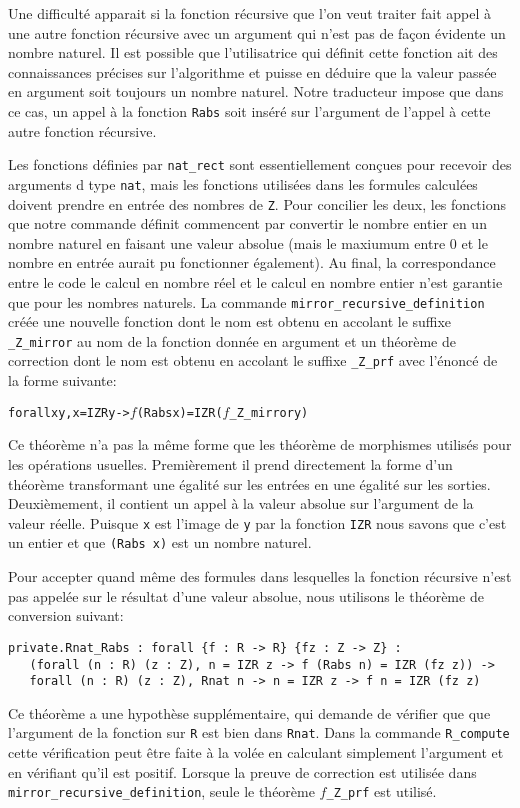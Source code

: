 \documentclass[draft]{jflart}
\begin{document}
Une difficulté apparait si la fonction récursive que l'on veut traiter
fait appel à une autre fonction récursive avec un argument qui n'est
pas de façon évidente un nombre naturel.  Il est possible que
l'utilisatrice qui définit cette fonction ait des connaissances
précises sur l'algorithme et puisse en déduire que la valeur passée
en argument soit toujours un nombre naturel.  Notre traducteur impose
que dans ce cas, un appel à la fonction \texttt{Rabs} soit inséré sur
l'argument de l'appel à cette autre fonction récursive.

Les fonctions définies par \texttt{nat\_rect} sont essentiellement
conçues pour recevoir des arguments d type \texttt{nat}, mais les
fonctions utilisées dans les formules calculées doivent prendre en
entrée des nombres de \texttt{Z}.  Pour concilier les deux, les fonctions
que notre commande définit commencent par convertir le nombre entier en
un nombre naturel en faisant une valeur absolue (mais le maxiumum
entre 0 et le nombre en entrée aurait pu fonctionner également).  Au
final, la correspondance entre le code le calcul en nombre réel et le
calcul en nombre entier n'est garantie que pour les nombres naturels.
La commande \texttt{mirror\_recursive\_definition} créée une nouvelle
fonction dont le nom est obtenu en accolant le suffixe
\texttt{\_Z\_mirror} au nom de la fonction donnée en argument et un théorème
de correction dont le nom est obtenu en accolant le suffixe
\texttt{\_Z\_prf} avec l'énoncé de la forme suivante:
\begin{alltt}
forall x y, x = IZR y -> \(f\) (Rabs x) = IZR (\(f\)_Z_mirror y)
\end{alltt}

Ce théorème n'a pas la même forme que les théorème de morphismes
utilisés pour les opérations usuelles.  Premièrement il prend
directement la forme d'un théorème transformant une égalité sur les
entrées en une égalité sur les sorties.  Deuxièmement, il contient
un appel à la valeur absolue sur l'argument de la valeur réelle.
Puisque \texttt{x} est l'image de \texttt{y} par la fonction \texttt{IZR} nous
savons que c'est un entier et que \texttt{(Rabs x)} est un nombre
naturel.

Pour accepter quand même des formules dans lesquelles la fonction
récursive n'est pas appelée sur le résultat d'une valeur absolue, nous
utilisons le théorème de conversion suivant:
\begin{verbatim}
private.Rnat_Rabs : forall {f : R -> R} {fz : Z -> Z} :
   (forall (n : R) (z : Z), n = IZR z -> f (Rabs n) = IZR (fz z)) ->
   forall (n : R) (z : Z), Rnat n -> n = IZR z -> f n = IZR (fz z)
\end{verbatim}
Ce théorème a une hypothèse supplémentaire, qui demande de vérifier
que que l'argument de la fonction sur \texttt{R} est bien dans
\texttt{Rnat}.  Dans la commande \texttt{R\_compute} cette vérification peut
être faite à la volée en calculant simplement l'argument et en vérifiant
qu'il est positif.  Lorsque la preuve de correction est utilisée dans
\texttt{mirror\_recursive\_definition}, seule le théorème
{\(f\)\texttt{\_Z\_prf}} est utilisé.
\end{document}
